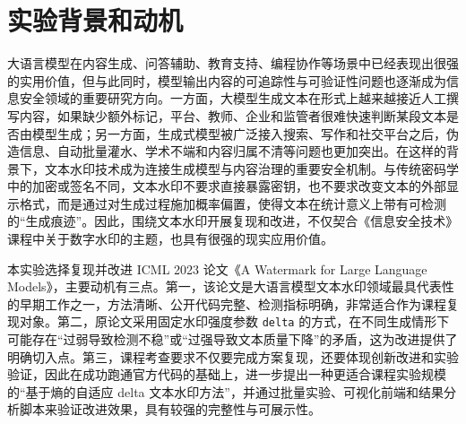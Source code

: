 \documentclass{SYSUReport}
\date{2026年6月}
\begin{document}
\cover
\thispagestyle{empty}
\clearpage

\begin{abstract}
本实验围绕大语言模型文本水印技术展开，选择 ICML 2023 论文《A Watermark for Large Language Models》作为复现对象，并在官方固定 \texttt{delta} 水印方案的基础上，设计了一种基于熵的自适应 \texttt{delta} 文本水印改进方法。实验首先对官方仓库进行完整复现，验证其在本地环境下能够稳定完成无水印文本生成、带水印文本生成与统计检测；随后在保留原始 greenlist 划分机制和检测框架不变的前提下，将固定偏置替换为随当前 token 概率分布熵动态变化的偏置，从而实现水印强度的自适应调节。正式实验统一使用 \texttt{opt-125m} 模型、12 条英文 prompts，并从 \texttt{z-score}、\texttt{green\_fraction}、检测成功率以及文本多样性等角度，对无水印方案、固定 \texttt{delta} 方案和自适应 \texttt{delta} 方案进行了批量对比。结果表明，固定大偏置方法虽然在检测强度上最强，但会明显降低文本质量；而自适应 \texttt{delta} 方法能够在保持较高水印检测能力的同时，缓解强固定偏置带来的重复增加和多样性下降问题，更适合作为一种“质量—检测均衡型”的课程改进方案。

\noindent \textbf{关键词：}大语言模型；文本水印；论文复现；自适应 delta；信息安全
\end{abstract}
\thispagestyle{empty}
\clearpage

\setcounter{page}{1}
\tableofcontents
\clearpage

\setcounter{page}{1}

\section{实验背景和动机}

大语言模型在内容生成、问答辅助、教育支持、编程协作等场景中已经表现出很强的实用价值，但与此同时，模型输出内容的可追踪性与可验证性问题也逐渐成为信息安全领域的重要研究方向。一方面，大模型生成文本在形式上越来越接近人工撰写内容，如果缺少额外标记，平台、教师、企业和监管者很难快速判断某段文本是否由模型生成；另一方面，生成式模型被广泛接入搜索、写作和社交平台之后，伪造信息、自动批量灌水、学术不端和内容归属不清等问题也更加突出。在这样的背景下，文本水印技术成为连接生成模型与内容治理的重要安全机制。与传统密码学中的加密或签名不同，文本水印不要求直接暴露密钥，也不要求改变文本的外部显示格式，而是通过对生成过程施加概率偏置，使得文本在统计意义上带有可检测的“生成痕迹”。因此，围绕文本水印开展复现和改进，不仅契合《信息安全技术》课程中关于数字水印的主题，也具有很强的现实应用价值。

本实验选择复现并改进 ICML 2023 论文《A Watermark for Large Language Models》，主要动机有三点。第一，该论文是大语言模型文本水印领域最具代表性的早期工作之一，方法清晰、公开代码完整、检测指标明确，非常适合作为课程复现对象。第二，原论文采用固定水印强度参数 \texttt{delta} 的方式，在不同生成情形下可能存在“过弱导致检测不稳”或“过强导致文本质量下降”的矛盾，这为改进提供了明确切入点。第三，课程考查要求不仅要完成方案复现，还要体现创新改进和实验验证，因此在成功跑通官方代码的基础上，进一步提出一种更适合课程实验规模的“基于熵的自适应 delta 文本水印方法”，并通过批量实验、可视化前端和结果分析脚本来验证改进效果，具有较强的完整性与可展示性。
\end{document}
